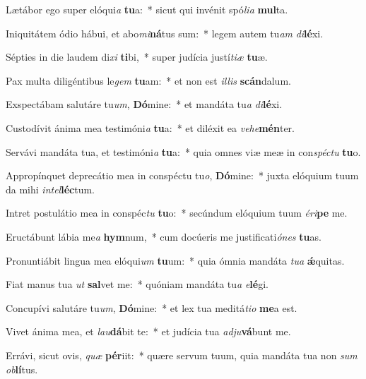 \item Lætábor ego super elóqui\textit{a} \textbf{tu}a:~* sicut qui invénit spó\textit{li}\textit{a} \textbf{mul}ta.
\item Iniquitátem ódio hábui, et abo\textit{mi}\textbf{ná}tus sum:~* legem autem tu\textit{am} \textit{di}\textbf{lé}xi.
\item Sépties in die laudem di\textit{xi} \textbf{ti}bi,~* super judícia justí\textit{ti}\textit{æ} \textbf{tu}æ.
\item Pax multa diligéntibus le\textit{gem} \textbf{tu}am:~* et non est \textit{il}\textit{lis} \textbf{scán}dalum.
\item Exspectábam salutáre tu\textit{um}, \textbf{Dó}mine:~* et mandáta tu\textit{a} \textit{di}\textbf{lé}xi.
\item Custodívit ánima mea testimóni\textit{a} \textbf{tu}a:~* et diléxit ea \textit{ve}\textit{he}\textbf{mén}ter.
\item Servávi mandáta tua, et testimóni\textit{a} \textbf{tu}a:~* quia omnes viæ meæ in con\textit{spéc}\textit{tu} \textbf{tu}o.
\item Appropínquet deprecátio mea in conspéctu tu\textit{o}, \textbf{Dó}mine:~* juxta elóquium tuum da mihi \textit{in}\textit{tel}\textbf{léc}tum.
\item Intret postulátio mea in conspéc\textit{tu} \textbf{tu}o:~* secúndum elóquium tuum \textit{é}\textit{ri}\textbf{pe} me.
\item Eructábunt lábia me\textit{a} \textbf{hym}num,~* cum docúeris me justificati\textit{ó}\textit{nes} \textbf{tu}as.
\item Pronuntiábit lingua mea elóqui\textit{um} \textbf{tu}um:~* quia ómnia mandáta \textit{tu}\textit{a} \textbf{ǽ}quitas.
\item Fiat manus tua \textit{ut} \textbf{sal}vet me:~* quóniam mandáta tu\textit{a} \textit{e}\textbf{lé}gi.
\item Concupívi salutáre tu\textit{um}, \textbf{Dó}mine:~* et lex tua meditá\textit{ti}\textit{o} \textbf{me}a est.
\item Vivet ánima mea, et \textit{lau}\textbf{dá}bit te:~* et judícia tua \textit{ad}\textit{ju}\textbf{vá}bunt me.
\item Errávi, sicut ovis, \textit{quæ} \textbf{pér}iit:~* quære servum tuum, quia mandáta tua non \textit{sum} \textit{ob}\textbf{lí}tus.
